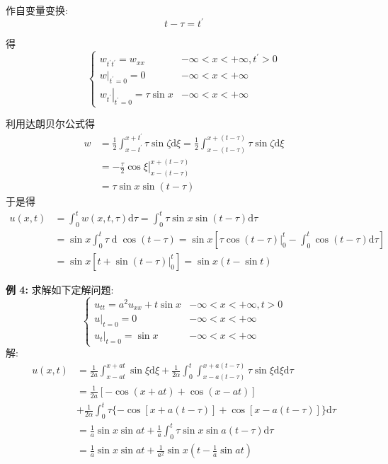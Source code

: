 作自变量变换:
$$
t-\tau=t^{\prime}
$$

得
$$
\left\{\begin{array}{ll}
w_{t^{\prime} t^{\prime}}=w_{x x} & -\infty<x<+\infty, t^{\prime}>0 \\
\left.w\right|_{t^{\prime}=0}=0 & -\infty<x<+\infty \\
\left.w_{t^{\prime}}\right|_{t^{\prime}=0}=\tau \sin x & -\infty<x<+\infty
\end{array}\right.
$$

利用达朗贝尔公式得
$$
\begin{aligned}
w & =\frac{1}{2} \int_{x-t^{\prime}}^{x+t^{\prime}} \tau \sin \zeta \mathrm{d} \xi=\frac{1}{2} \int_{x-(t-\tau)}^{x+(t-\tau)} \tau \sin \zeta \mathrm{d} \xi \\
& =-\left.\frac{\tau}{2} \cos \xi\right|_{x-(t-\tau)} ^{x+(t-\tau)} \\
& =\tau \sin x \sin (t-\tau)
\end{aligned}
$$
于是得
$$
\begin{aligned}
u(x, t) & =\int_{0}^{t} w(x, t, \tau) \mathrm{d} \tau=\int_{0}^{t} \tau \sin x \sin (t-\tau) \mathrm{d} \tau \\
& =\sin x \int_{0}^{t} \tau \operatorname{d} \cos (t-\tau)=\sin x\left[\left.\tau \cos (t-\tau)\right|_{0} ^{t}-\int_{0}^{t} \cos (t-\tau) \mathrm{d} \tau\right] \\
& =\sin x\left[t+\left.\sin (t-\tau)\right|_{0} ^{t}\right]=\sin x(t-\sin t)
\end{aligned}
$$

\textbf{例 4:} 求解如下定解问题:
$$
\left\{\begin{array}{ll}
u_{t t}=a^{2} u_{x x}+t \sin x & -\infty<x<+\infty, t>0 \\
\left.u\right|_{t=0}=0 & -\infty<x<+\infty \\
\left.u_{t}\right|_{t=0}=\sin x & -\infty<x<+\infty
\end{array}\right.
$$
解:
$$
\begin{aligned}
u(x, t) & =\frac{1}{2 a} \int_{x-a t}^{x+a t} \sin \xi \mathrm{d} \xi+\frac{1}{2 \alpha} \int_{0}^{t} \int_{x-a(t-\tau)}^{x+a(t-\tau)} \tau \sin \xi \mathrm{d} \xi \mathrm{d} \tau \\
& =\frac{1}{2 a}[-\cos (x+a t)+\cos (x-a t)] \\
& +\frac{1}{2 \alpha} \int_{0}^{t} \tau\{-\cos [x+a(t-\tau)]+\cos [x-a(t-\tau)]\} \mathrm{d} \tau \\
& =\frac{1}{a} \sin x \sin a t+\frac{1}{a} \int_{0}^{t} \tau \sin x \sin a(t-\tau) \mathrm{d} \tau \\
& =\frac{1}{a} \sin x \sin a t+\frac{1}{a^{2}} \sin x\left(t-\frac{1}{a} \sin a t\right) 
\end{aligned}
$$

